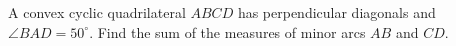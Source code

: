 A convex cyclic quadrilateral $ABCD$ has perpendicular diagonals and $\angle BAD=50^\circ$. Find the sum of the measures of minor arcs $AB$ and $CD$.
